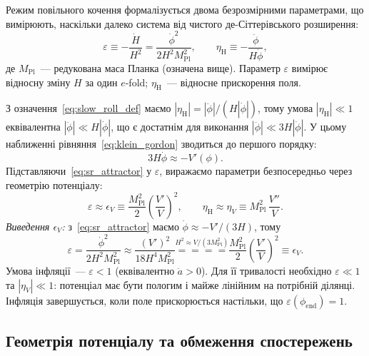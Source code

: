 \documentclass[12pt, a4paper]{article}
\begin{document}
Режим повільного кочення формалізується двома безрозмірними
параметрами, що вимірюють, наскільки далеко система від чистого
де-Сіттерівського розширення:
\begin{equation}\label{eq:slow_roll_def}
  \varepsilon \equiv -\frac{\dot H}{H^2}
             = \frac{\dot\phi^2}{2H^2 M_\mathrm{Pl}^2},
  \qquad
  \eta_{\mathrm{H}} \equiv -\frac{\ddot{\phi}}{H\dot{\phi}},
\end{equation}
де $M_\mathrm{Pl}$~--- редукована маса Планка (означена вище).
Параметр $\varepsilon$ вимірює відносну зміну $H$ за один $e$-fold;
$\eta_{\mathrm{H}}$~--- відносне прискорення поля.


З означення~\eqref{eq:slow_roll_def} маємо
$|\eta_\mathrm{H}| = |\ddot\phi|/(H|\dot\phi|)$, тому умова
$|\eta_\mathrm{H}| \ll 1$ еквівалентна $|\ddot\phi| \ll H|\dot\phi|$,
що є достатнім для виконання $|\ddot\phi| \ll 3H|\dot\phi|$.
У цьому наближенні рівняння~\eqref{eq:klein_gordon} зводиться
до першого порядку:
\begin{equation}\label{eq:sr_attractor}
  3H\dot{\phi} \approx -V'(\phi).
\end{equation}
Підставляючи~\eqref{eq:sr_attractor} у $\varepsilon$, виражаємо
параметри безпосередньо через геометрію потенціалу:
\begin{equation}\label{eq:slow_roll_pot}
  \varepsilon \approx \epsilon_V
    \equiv \frac{M_\mathrm{Pl}^2}{2}\!\left(\frac{V'}{V}\right)^2,
  \qquad
  \eta_{\mathrm{H}} \approx \eta_V
    \equiv M_\mathrm{Pl}^2\,\frac{V''}{V}.
\end{equation}
\textit{Виведення $\epsilon_V$:} з~\eqref{eq:sr_attractor}
маємо $\dot\phi \approx -V'/(3H)$, тому
\begin{equation*}
  \varepsilon
    = \frac{\dot\phi^2}{2H^2 M_\mathrm{Pl}^2}
    \approx \frac{(V')^2}{18 H^4 M_\mathrm{Pl}^2}
    \overset{H^2\approx V/(3M_\mathrm{Pl}^2)}{=\!=\!=\!=}
    \frac{M_\mathrm{Pl}^2}{2}\!\left(\frac{V'}{V}\right)^2
    \equiv \epsilon_V.
\end{equation*}
Умова інфляції~--- $\varepsilon < 1$ (еквівалентно $\ddot{a} > 0$).
Для її тривалості необхідно $\varepsilon \ll 1$ та $|\eta_V| \ll 1$:
потенціал має бути пологим і майже лінійним на потрібній ділянці.
Інфляція завершується, коли поле прискорюється настільки, що
$\varepsilon(\phi_{\mathrm{end}}) = 1$.

\subsection{Геометрія потенціалу та обмеження спостережень}
\end{document}
